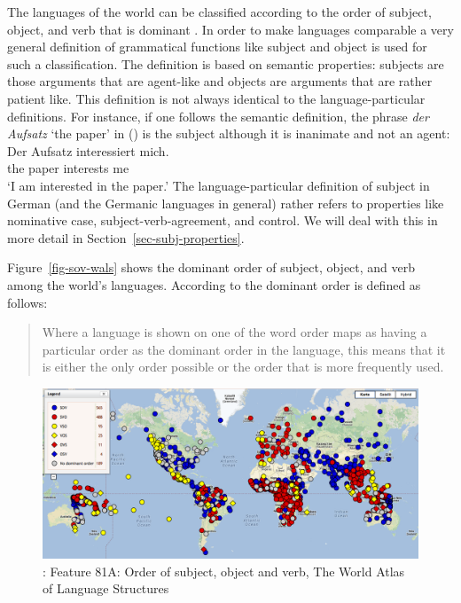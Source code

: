 The languages of the world can be classified according to the order of subject, object, and verb
that is dominant \citep{Greenberg63a-u}. In order to make languages comparable a very general definition of grammatical
functions like subject and object is used
for such a classification. The definition is based on semantic properties: subjects are those
arguments that are agent-like and objects are arguments that are rather patient like. This definition
is not always identical to the language-particular definitions. For instance, if one follows the
semantic definition, the phrase \emph{der
  Aufsatz} `the paper' in () is the subject although it is inanimate and not an agent: 
\ea
\gll Der Aufsatz interessiert mich.\\
     the paper   interests    me\\
\glt `I am interested in the paper.'
\z
The language-particular definition of subject in German (and the Germanic languages in general)
rather refers to properties like nominative case, subject-verb-agreement, and control. We will deal with this in more
detail in Section~\ref{sec-subj-properties}.

Figure~\vref{fig-sov-wals} shows the dominant order of subject, object, and verb among the world's languages.
According to \citet{Dryer2013a} the dominant order is defined as follows:

\begin{quote}
Where a language is shown on one of the word order maps as having a particular order as the dominant
order in the language, this means that it is either the only order possible or the order
that is more frequently used. \citep{Dryer2013a}
\end{quote}
%
%
%
\begin{figure}
\includegraphics[width=\textwidth]{Pictures/WALS-SOV}
\caption{\label{fig-sov-wals}\citet[Section~1]{Dryer2013c}: Feature 81A: Order of subject, object and verb, The World Atlas of Language Structures} 
\end{figure}

